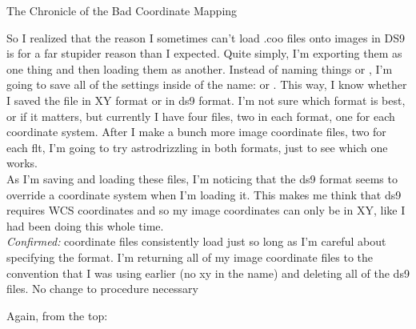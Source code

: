 \documentclass[11pt,obeyspaces]{article} %
\begin{document}
\begin{oframed}
\centerline{\sc The Chronicle of the Bad Coordinate Mapping}
So I realized that the reason I sometimes can't load .coo files onto images in DS9 is for a far stupider reason than I expected. Quite simply, I'm exporting them as one thing and then loading them as another. Instead of naming things  or , I'm going to save all of the settings inside of the name:  or . This way, I know whether I saved the file in XY format or in ds9 format. I'm not sure which format is best, or if it matters, but currently I have four files, two in each format, one for each coordinate system. After I make a bunch more image coordinate files, two for each flt, I'm going to try astrodrizzling in both formats, just to see which one works. \\
As I'm saving and loading these files, I'm noticing that the ds9 format seems to override a coordinate system when I'm loading it. This makes me think that ds9 requires WCS coordinates and so my image coordinates can only be in XY, like I had been doing this whole time. \\

\textit{Confirmed:} coordinate files consistently load just so long as I'm careful about specifying the format. I'm returning all of my image coordinate files to the convention that I was using earlier (no xy in the name) and deleting all of the ds9 files. No change to procedure necessary
\end{oframed}
\bigskip
\centerline{\Huge Again, from the top:}
\end{document}
